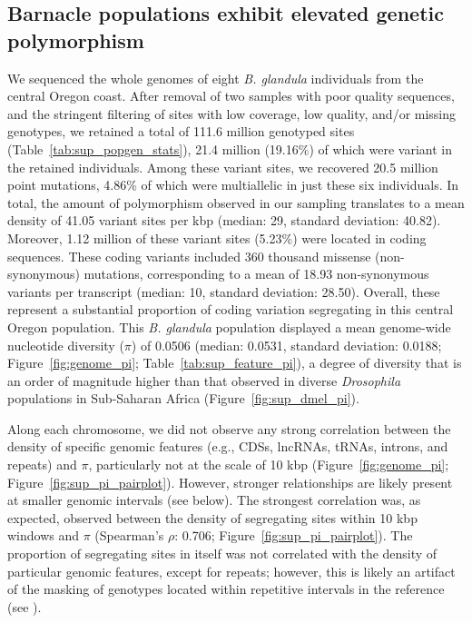 \documentclass[11pt]{article}
\newcommand{\bgla}{\textit{B. glandula}\xspace}
\begin{document}
\subsection*{Barnacle populations exhibit elevated genetic polymorphism}

We sequenced the whole genomes of eight \bgla{} individuals from the central Oregon coast.
After removal of two samples with poor quality sequences, and the stringent filtering of
sites with low coverage, low quality, and/or missing genotypes, we retained a total of
111.6 million genotyped sites (Table~\ref{tab:sup_popgen_stats}), 21.4 million (19.16\%)
of which were variant in the retained individuals.
Among these variant sites, we recovered 20.5 million point mutations, 4.86\% of which 
were multiallelic in just these six individuals.
In total, the amount of polymorphism observed in our sampling translates to a mean
density of 41.05 variant sites per kbp (median: 29, standard deviation: 40.82).
Moreover, 1.12 million of these variant sites (5.23\%) were located in coding sequences.
These coding variants included 360 thousand missense (non-synonymous) mutations,
corresponding to a mean of 18.93 non-synonymous variants per transcript
(median: 10, standard deviation: 28.50).
Overall, these represent a substantial proportion of coding variation segregating in
this central Oregon population.
This \bgla{} population displayed a mean genome-wide nucleotide
diversity ($\pi$) of 0.0506 (median: 0.0531, standard deviation: 0.0188;
Figure~\ref{fig:genome_pi}; Table~\ref{tab:sup_feature_pi}), a degree of diversity that
is an order of magnitude higher than that observed in diverse \textit{Drosophila}
populations in Sub-Saharan Africa (Figure~\ref{fig:sup_dmel_pi}).
\vspace{0.2cm}

Along each chromosome, we did not observe any strong correlation between the density
of specific genomic features (e.g., CDSs, lncRNAs, tRNAs, introns, and repeats) and
$\pi$, particularly not at the scale of 10 kbp (Figure~\ref{fig:genome_pi};
Figure~\ref{fig:sup_pi_pairplot}). However, stronger relationships are likely present
at smaller genomic intervals (see below). The strongest correlation was, as expected,
observed between the density of segregating sites within 10 kbp windows and $\pi$
(Spearman's $\rho$: 0.706; Figure~\ref{fig:sup_pi_pairplot}). The proportion of
segregating sites in itself was not correlated with the density of particular genomic
features, except for repeats; however, this is likely an artifact of the masking of
genotypes located within repetitive intervals in the reference
(see ).
\vspace{0.2cm}
\end{document}
